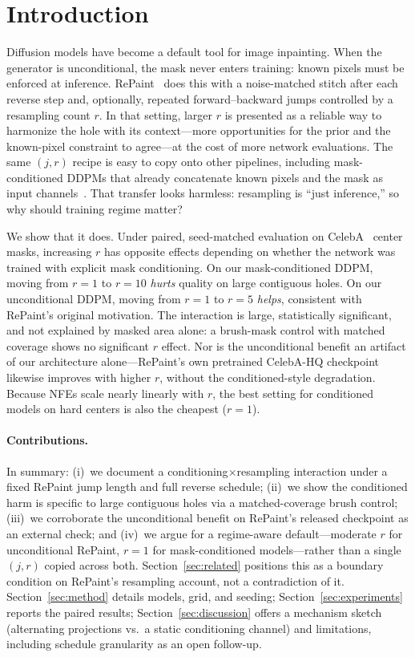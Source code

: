 \section{Introduction}
\label{sec:intro}

Diffusion models have become a default tool for image inpainting.
When the generator is unconditional, the mask never enters training: known pixels must be enforced at inference.
RePaint~\citep{lugmayr2022repaint} does this with a noise-matched stitch after each reverse step and, optionally, repeated forward--backward jumps controlled by a resampling count $r$.
In that setting, larger $r$ is presented as a reliable way to harmonize the hole with its context---more opportunities for the prior and the known-pixel constraint to agree---at the cost of more network evaluations.
The same $(j,r)$ recipe is easy to copy onto other pipelines, including mask-conditioned DDPMs that already concatenate known pixels and the mask as input channels~\citep{saharia2022palette}.
That transfer looks harmless: resampling is ``just inference,'' so why should training regime matter?

We show that it does.
Under paired, seed-matched evaluation on CelebA~\citep{liu2015celeba} center masks, increasing $r$ has opposite effects depending on whether the network was trained with explicit mask conditioning.
On our mask-conditioned DDPM, moving from $r{=}1$ to $r{=}10$ \emph{hurts} quality on large contiguous holes.
On our unconditional DDPM, moving from $r{=}1$ to $r{=}5$ \emph{helps}, consistent with RePaint's original motivation.
The interaction is large, statistically significant, and not explained by masked area alone: a brush-mask control with matched coverage shows no significant $r$ effect.
Nor is the unconditional benefit an artifact of our architecture alone---RePaint's own pretrained CelebA-HQ checkpoint likewise improves with higher $r$, without the conditioned-style degradation.
Because NFEs scale nearly linearly with $r$, the best setting for conditioned models on hard centers is also the cheapest ($r{=}1$).

\paragraph{Contributions.}
In summary: (i)~we document a conditioning$\times$resampling interaction under a fixed RePaint jump length and full reverse schedule; (ii)~we show the conditioned harm is specific to large contiguous holes via a matched-coverage brush control; (iii)~we corroborate the unconditional benefit on RePaint's released checkpoint as an external check; and (iv)~we argue for a regime-aware default---moderate $r$ for unconditional RePaint, $r{=}1$ for mask-conditioned models---rather than a single $(j,r)$ copied across both.
Section~\ref{sec:related} positions this as a boundary condition on RePaint's resampling account, not a contradiction of it.
Section~\ref{sec:method} details models, grid, and seeding; Section~\ref{sec:experiments} reports the paired results; Section~\ref{sec:discussion} offers a mechanism sketch (alternating projections vs.\ a static conditioning channel) and limitations, including schedule granularity as an open follow-up.
